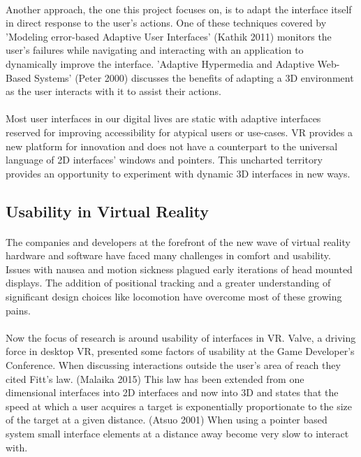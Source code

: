 \documentclass[11pt]{article}
\begin{document}
\paragraph{} 
Another approach, the one this project focuses on, is to adapt the interface itself in direct response to the user's actions. One of these techniques covered by 'Modeling error-based Adaptive User Interfaces' (Kathik 2011) monitors the user's failures while navigating and interacting with an application to dynamically improve the interface. 'Adaptive Hypermedia and Adaptive Web-Based Systems' (Peter 2000) discusses the benefits of adapting a 3D environment as the user interacts with it to assist their actions.

\paragraph{} 
Most user interfaces in our digital lives are static with adaptive interfaces reserved for improving accessibility for atypical users or use-cases. VR provides a new platform for innovation and does not have a counterpart to the universal language of 2D interfaces' windows and pointers. This uncharted territory provides an opportunity to experiment with dynamic 3D interfaces in new ways.

\subsection{Usability in Virtual Reality}

\paragraph{}
The companies and developers at the forefront of the new wave of virtual reality hardware and software have faced many challenges in comfort and usability. Issues with nausea and motion sickness plagued early iterations of head mounted displays. The addition of positional tracking and a greater understanding of significant design choices like locomotion have overcome most of these growing pains.

\paragraph{} 
Now the focus of research is around usability of interfaces in VR. Valve, a driving force in desktop VR, presented some factors of usability at the Game Developer's Conference. When discussing interactions outside the user's area of reach they cited Fitt's law. (Malaika 2015) This law has been extended from one dimensional interfaces into 2D interfaces and now into 3D and states that the speed at which a user acquires a target is exponentially proportionate to the size of the target at a given distance. (Atsuo 2001) When using a pointer based system small interface elements at a distance away become very slow to interact with.
\end{document}
